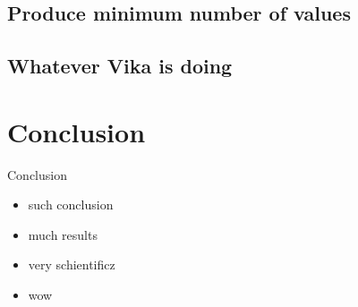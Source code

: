 \documentclass[hyperref=unicode,graphics=pdflatex,13pt]{beamer}
\begin{document}
\subsection{Produce minimum number of values}

\subsection{Whatever Vika is doing}

\section{Conclusion} %

\begin{frame}{Conclusion}
 \begin{itemize}
  \item such conclusion
  \item much results
  \item very schientificz
  \item wow
 \end{itemize}

\end{frame}
\end{document}
